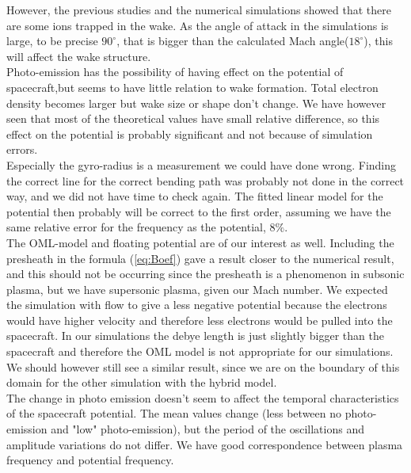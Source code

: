 \documentclass[aip, 
rsi, 
amsmath,
amssymb,
longbibliography,
reprint]{revtex4-1}
\begin{document}
However, the previous studies \cite{P1} and the numerical simulations showed that there are some ions trapped in the wake. As the angle of attack in the simulations is large, to be precise $90^{\circ}$, that is bigger than the calculated Mach angle($18^{\circ}$), this will affect the wake structure.\\

Photo-emission has the possibility of having effect on the potential of spacecraft,but seems to have little relation to wake formation. Total electron density becomes larger but wake size or shape don't change. We have however seen that most of the theoretical values have small relative difference, so this effect on the potential is probably significant and not because of simulation errors.\\

Especially the gyro-radius is a measurement we could have done wrong. Finding the correct line for the correct bending path was probably not done in the correct way, and we did not have time to check again. The fitted linear model for the potential then probably will be correct to the first order, assuming we have the same relative error for the frequency as the potential, $8\%$.\\

The OML-model and floating potential are of our interest as well. Including the presheath in the formula (\ref{eq:Boef}) gave a result closer to the numerical result, and this should not be occurring since the presheath is a phenomenon in subsonic plasma, but we have supersonic plasma, given our Mach number. We expected the simulation with flow to give a less negative potential because the electrons would have higher velocity and therefore less electrons would be pulled into the spacecraft. In our simulations the debye length is just slightly bigger than the spacecraft and therefore the OML model is not appropriate for our simulations. We should however still see a similar result, since we are on the boundary of this domain for the other simulation with the hybrid model\cite{P7}.\\

The change in photo emission doesn't seem to affect the temporal characteristics of the spacecraft potential. The mean values change (less between no photo-emission and "low" photo-emission), but the period of the oscillations and amplitude variations do not differ. We have good correspondence between plasma frequency and potential frequency.\\
\end{document}
